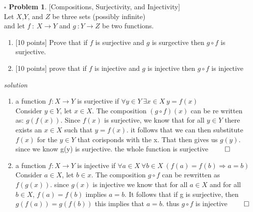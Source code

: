\documentclass[11pt,twoside]{amsart}
\theoremstyle{definition}
\newtheorem{bprob}{$\square$ Problem}
\begin{document}
\newpage
\begin{bprob} {[Compositions, Surjectivity, and Injectivity]} \\
  Let $X$,$Y$, and $Z$ be three sets (possibly infinite) \\
  and let $f \ : \ X \rightarrow Y$ and $g \ : Y \rightarrow Z$ be two functions.

  \begin{enumerate}[label= 3.\arabic*, itemsep=0.2cm]
    \item {[10 points]} Prove that if $f$ is surjective and $g$ is surgective then $g \circ f$ is surjective.
    \item {[10 points]} prove that if $f$ is injective and $g$ is injective then $g \circ f$ is injective

  \end{enumerate}
\end{bprob}
\emph{solution}

\begin{enumerate}[label=3.\arabic*, itemsep = 0.4cm]
  \item %
        a function  $f:X \to Y$ is surjective if $\forall y \in Y \ \exists x \in X \ y = f(x)$ \bigskip \\
 Consider $y \in Y$, let $x \in X$.
 The composition $(g\circ f)(x)$ can be re written as: $g(f(x))$.
Since $f(x)$ is surjective, we know that for all $y \in Y$ there exists an $x \in X$ such that $y = f(x)$. it follows that we can then substitute $f(x)$ for the $y \in Y$ that corisponds with the x. That then gives us $g(y)$. since we know g(y) is surjective. the whole function is surjective $\qed$

  \item %
     a function $f : X \rightarrow Y$ is injective if $\forall a \in X \ \forall b \in X \ (f(a) = f(b) \Rightarrow a=b)$ \bigskip \\
       Consider $a \in X$, let $b \in x$.
The composition $g \circ f$ can be rewritten as $f(g(x))$. since $g(x)$ is injective we know that for all $a \in X$ and for all $b \in X$, $f(a) = f(b)$ implies $a=b$. It follows that if g is surjective, then $g(f(a)) = g(f(b))$ this implies that $a=b$. thus $g \circ f$ is injective $\qed$ 
    
    
\end{enumerate}
	
\end{document}
